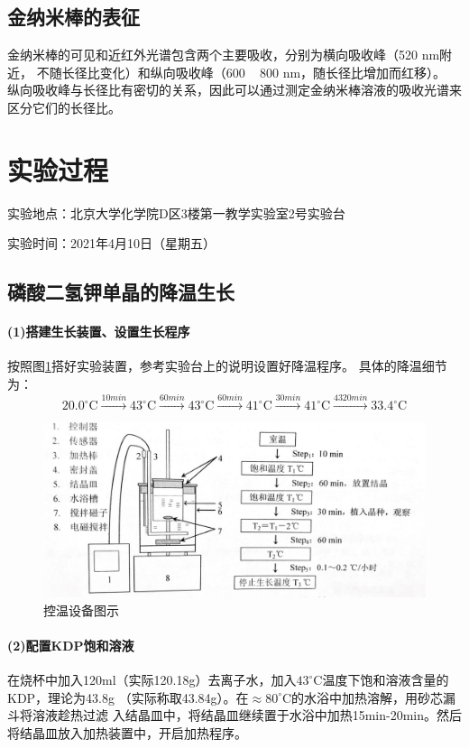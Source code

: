 \documentclass[a4paper,zihao=5,UTF8]{ctexart}
\newcommand{\mr}[1]{\mathrm{#1}}
\def\celsius{^{\circ}\mr{C}}
\begin{document}
    \subsection{金纳米棒的表征}
    金纳米棒的可见和近红外光谱包含两个主要吸收，分别为横向吸收峰（520 nm附近，
    不随长径比变化）和纵向吸收峰（600 ~ 800 nm，随长径比增加而红移）。
    纵向吸收峰与长径比有密切的关系，因此可以通过测定金纳米棒溶液的吸收光谱来区分它们的长径比。

    \section{实验过程}
    实验地点：北京大学化学院D区3楼第一教学实验室2号实验台
	\par 
	实验时间：2021年4月10日（星期五）
    \subsection{磷酸二氢钾单晶的降温生长}
    \paragraph{(1)搭建生长装置、设置生长程序}
    按照图\ref{jiangwenshebei}搭好实验装置，参考实验台上的说明设置好降温程序。
    具体的降温细节为：
    $$
    20.0\celsius\stackrel{10min}{\longrightarrow}43\celsius\stackrel{60min}{\longrightarrow}
    43\celsius\stackrel{60min}{\longrightarrow}41\celsius\stackrel{30min}{\longrightarrow}
    41\celsius\stackrel{4320min}{\longrightarrow}33.4\celsius
    $$
    \begin{figure}[htbp]
        \centering
        \includegraphics[scale=1.0]{jiangwenshebei.png}
        \caption{控温设备图示}
        \label{jiangwenshebei}
    \end{figure}
    \paragraph{(2)配置KDP饱和溶液}
    在烧杯中加入120ml（实际120.18g）去离子水，加入$43\celsius$温度下饱和溶液含量的KDP，理论为43.8g
    （实际称取43.84g）。在$\approx 80\celsius$的水浴中加热溶解，用砂芯漏斗将溶液趁热过滤
    入结晶皿中，将结晶皿继续置于水浴中加热15min-20min。然后将结晶皿放入加热装置中，开启加热程序。
\end{document}
